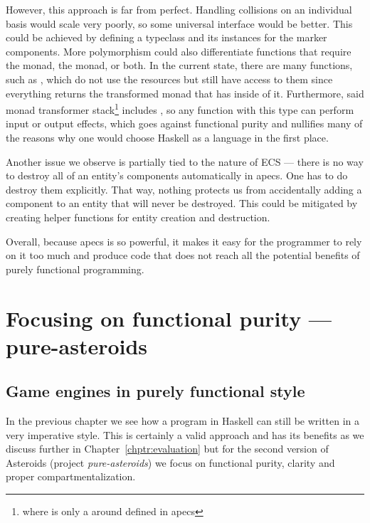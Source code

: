 \documentclass[
  digital, %
  color,   %
  table,   %
  oneside, %
  lof,     %
  lot,     %
]{fithesis3}
\begin{document}
However, this approach is far from perfect. Handling collisions on an
individual basis would scale very poorly, so some universal interface would be better.
This could be achieved by defining a typeclass and its instances for the marker components.
More polymorphism could also differentiate functions that require the
 monad, the  monad, or both.
In the current state, there are many functions, such as ,
which do not use the resources but still have access to them since
everything returns the transformed  monad
that has  inside of it. Furthermore,
said monad transformer stack\footnote{
where  is only a 
around  defined in apecs
}
includes , so any function with this type can perform
input or output effects, which goes against functional purity and nullifies
many of the reasons why one would choose Haskell as a language in the first place.

Another issue we observe is partially tied to the nature of ECS --- there
is no way to destroy all of an entity's components automatically in apecs.
One has to do destroy them explicitly. That way, nothing protects us
from accidentally adding a component to an entity that will never be destroyed.
This could be mitigated by creating helper functions for entity creation and destruction.

Overall, because apecs is so powerful, it makes it easy for the programmer to rely
on it too much and produce code that does not reach all the potential
benefits of purely functional programming.




\chapter{Focusing on functional purity --- pure-asteroids}
\label{chptr:purity}

\section{Game engines in purely functional style}
\label{sect:pureengines}

In the previous chapter we see how a program in Haskell can still be
written in a very imperative style. 
This is certainly a valid approach and has its benefits as we discuss
further in Chapter~\ref{chptr:evaluation} but for the second version of
Asteroids (project \emph{pure-asteroids}) we focus on functional purity,
clarity and proper compartmentalization.
\end{document}
